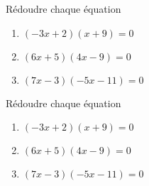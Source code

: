 \begin{exercice*}
    Rédoudre chaque équation
    \begin{enumerate}
        \item $(-3x+2)(x+9)=0$
        \item $(6x+5)(4x-9)=0$
        \item $(7x-3)(-5x-11)=0$
    \end{enumerate}
\end{exercice*}
\begin{corrige}
    Rédoudre chaque équation

    \begin{enumerate}
        \item $(-3x+2)(x+9)=0$
        
        \item $(6x+5)(4x-9)=0$
        
    \end{enumerate}
    \Coupe
    \begin{enumerate}
        \setcounter{enumi}{2}
        \item $(7x-3)(-5x-11)=0$
        
    \end{enumerate}
\end{corrige}
